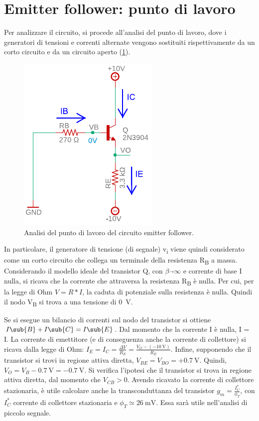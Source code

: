 \section{Emitter follower: punto di lavoro}
Per analizzare il circuito, si procede all'analisi del punto di lavoro, dove i generatori di tensioni e correnti alternate vengono sostituiti rispettivamente da un corto circuito e da un circuito aperto (\Fig\ref{fig:emitterfollwer_puntodilavoro}).
\begin{figure}[h!]
	\centering
	\includegraphics[width=0.4\linewidth]{./OtherFiles/Laboratorio 1/emitter follower_punto di lavoro_printout}
	\caption{Analisi del punto di lavoro del circuito emitter follower.}
	\label{fig:emitterfollwer_puntodilavoro}
\end{figure}
In particolare, il generatore di tensione (di segnale) v\textsubscript{i} viene quindi considerato come un corto circuito che collega un terminale della resistenza R\textsubscript{B} a massa. Considerando il modello ideale del transistor Q, con $\beta\overrightarrow{}\infty$ e corrente di base I nulla, si ricava che la corrente che attraversa la resistenza R\textsubscript{B} è nulla. Per cui, per la legge di Ohm $V=R*I$, la caduta di potenziale sulla resistenza è nulla. Quindi il nodo V\textsubscript{B} si trova a una tensione di \SI{0}{\volt}. 

Se si esegue un bilancio di correnti sul nodo del transistor si ottiene $I\sub{B}+I\sub{C}=I\sub{E}$. Dal momento che la corrente I è nulla, I = I. La corrente di emettitore (e di conseguenza anche la corrente di collettore) si ricava dalla legge di Ohm: $I_E=I_C=\frac{\Delta V}{R_E}=\frac{V_O-(-\SI{10}{\volt})}{R_E}$. Infine, supponendo che il transistor si trovi in regione attiva diretta, $V_{BE}=V_{BO}=+\SI{0.7}{\volt}$. Quindi, $V_O=V_B-\SI{0.7}{\volt}= -\SI{0.7}{\volt}$. Si verifica l'ipotesi che il transistor si trova in regione attiva diretta, dal momento che $V_{CB}>0$. Avendo ricavato la corrente di collettore stazionaria, è utile calcolare anche la transconduttanza del transistor $g_m=\frac{I_C^*}{\phi_T}$, con $I_C^*$ corrente di collettore stazionaria e $\phi_T\simeq\SI{26}{\milli\volt}$. Essa sarà utile nell'analisi di piccolo segnale.

